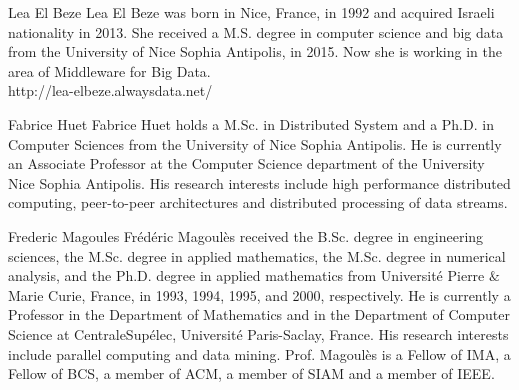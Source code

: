 \documentclass[10pt,journal,compsoc]{IEEEtran}
\begin{document}
\begin{IEEEbiography}
{Lea El Beze}
Lea El Beze was born in Nice, France, in 1992 and acquired Israeli nationality in 2013. She received a M.S. degree 
in computer science and big data from the University of Nice Sophia Antipolis, in 2015. Now she is working in the area of Middleware for Big Data.
\\
http://lea-elbeze.alwaysdata.net/
\end{IEEEbiography}

\begin{IEEEbiography}
{Fabrice Huet}
Fabrice Huet holds a M.Sc. in Distributed System and a Ph.D. in Computer Sciences from the University of Nice Sophia 
Antipolis. He is currently an Associate Professor at the Computer Science department of the University Nice Sophia 
Antipolis. His research interests include high performance distributed computing, peer-to-peer architectures and 
distributed processing of data streams. 
\end{IEEEbiography}

\begin{IEEEbiography}
{Frederic Magoules}
Fr\'ed\'eric Magoul\`es received the B.Sc. degree in engineering sciences,
the M.Sc. degree in applied mathematics, the M.Sc. degree in numerical analysis,
and the Ph.D. degree in applied mathematics from Universit\'e Pierre $\&$
Marie Curie, France, in 1993, 1994, 1995, and 2000, respectively.
He is currently a Professor in the Department of Mathematics and in the Department
of Computer Science at CentraleSup\'elec, Universit\'e Paris-Saclay, France. His research
interests include parallel computing and data mining.
Prof. Magoul\`es is a Fellow of IMA, a Fellow of BCS, a member of ACM,
a member of SIAM and a member of IEEE.
\end{IEEEbiography}
\end{document}
